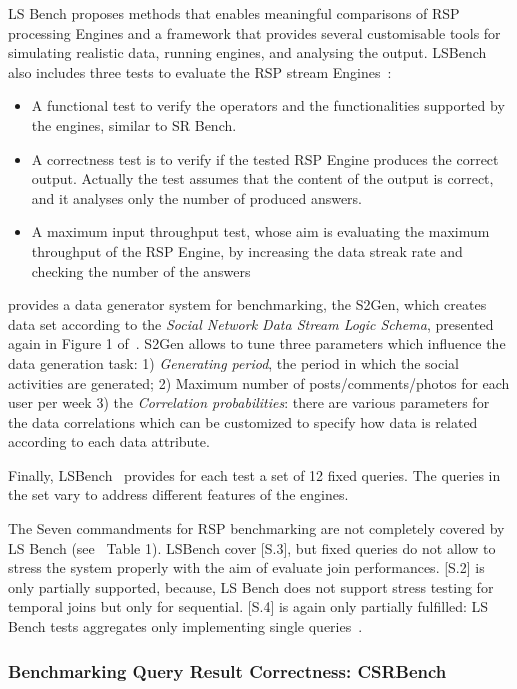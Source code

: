 LS Bench proposes methods that enables meaningful comparisons of RSP processing Engines and a framework that provides several customisable tools for simulating realistic data, running engines, and analysing the output. LSBench also includes three tests to evaluate the RSP stream Engines~\cite{DBLP:conf/semweb/DellAglioCBCV13}:
\begin{itemize}
\item A functional test to verify the operators and the functionalities supported
by the engines, similar to SR Bench.
\item A correctness test is to verify if the tested RSP Engine produces the correct output. Actually the test assumes that the content of the output is correct, and it analyses only the number of produced answers.
\item A maximum input throughput test, whose aim is evaluating the maximum throughput of the RSP Engine, by increasing the data streak rate and checking the number of the answers
\end{itemize}

\cite{LePhuoc2012c} provides a data generator system for benchmarking, the S2Gen, which creates data set according to the \textit{Social Network Data Stream Logic Schema}, presented again in Figure 1 of~\cite{LePhuoc2012c}. S2Gen allows to tune three parameters which influence the data generation task: 1) \textit{Generating period}, the period in which the social activities are generated; 2) Maximum number of posts/comments/photos for each user per week 3) the \textit{Correlation probabilities}: there are various parameters for the data correlations which can be customized to specify how data is related according to each data attribute.

Finally, LSBench~\cite{LePhuoc2012c} provides for each test a set of 12 fixed queries. The queries in the set vary to address different features of the engines. 

The Seven commandments for RSP benchmarking are not completely covered by LS Bench (see~\cite{DBLP:conf/esws/ScharrenbachUMVB13} Table 1). LSBench cover [S.3], but fixed queries do not allow to stress the system properly with the aim of evaluate join performances. [S.2] is only partially supported, because, LS Bench does not support stress testing for temporal joins but only for sequential. [S.4] is again only partially fulfilled: LS Bench tests aggregates only implementing single queries~\cite{DBLP:conf/esws/ScharrenbachUMVB13}.

\subsubsection{Benchmarking Query Result Correctness: CSRBench}

